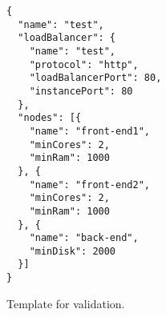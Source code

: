 \begin{figure}
  \begin{center}
    \begin{verbatim}
{
  "name": "test",
  "loadBalancer": {
    "name": "test",
    "protocol": "http",
    "loadBalancerPort": 80,
    "instancePort": 80
  },
  "nodes": [{   
    "name": "front-end1",
    "minCores": 2,
    "minRam": 1000
  }, {   
    "name": "front-end2",
    "minCores": 2,
    "minRam": 1000
  }, {   
    "name": "back-end",
    "minDisk": 2000
  }]
}
    \end{verbatim}
  \end{center}
  \caption{Template for validation.}
  \label{list:validation-threenodes}
\end{figure}

